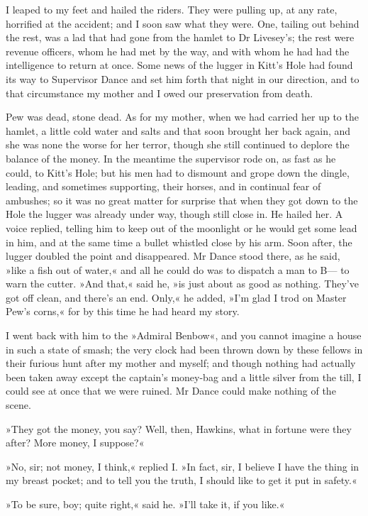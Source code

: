 I leaped to my feet and hailed the riders. They were pulling up, at any rate, horrified at the accident; and I soon saw what they were. One, tailing out behind the rest, was a lad that had gone from the hamlet to Dr Livesey's; the rest were revenue officers, whom he had met by the way, and with whom he had had the intelligence to return at once. Some news of the lugger in Kitt's Hole had found its way to Supervisor Dance and set him forth that night in our direction, and to that circumstance my mother and I owed our preservation from death.

Pew was dead, stone dead. As for my mother, when we had carried her up to the hamlet, a little cold water and salts and that soon brought her back again, and she was none the worse for her terror, though she still continued to deplore the balance of the money. In the meantime the supervisor rode on, as fast as he could, to Kitt's Hole; but his men had to dismount and grope down the dingle, leading, and sometimes supporting, their horses, and in continual fear of ambushes; so it was no great matter for surprise that when they got down to the Hole the lugger was already under way, though still close in. He hailed her. A voice replied, telling him to keep out of the moonlight or he would get some lead in him, and at the same time a bullet whistled close by his arm. Soon after, the lugger doubled the point and disappeared. Mr Dance stood there, as he said, »like a fish out of water,« and all he could do was to dispatch a man to B— to warn the cutter. »And that,« said he, »is just about as good as nothing. They've got off clean, and there's an end. Only,« he added, »I'm glad I trod on Master Pew's corns,« for by this time he had heard my story.

I went back with him to the »Admiral Benbow«, and you cannot imagine a house in such a state of smash; the very clock had been thrown down by these fellows in their furious hunt after my mother and myself; and though nothing had actually been taken away except the captain's money-bag and a little silver from the till, I could see at once that we were ruined. Mr Dance could make nothing of the scene.

»They got the money, you say? Well, then, Hawkins, what in fortune were they after? More money, I suppose?«

»No, sir; not money, I think,« replied I. »In fact, sir, I believe I have the thing in my breast pocket; and to tell you the truth, I should like to get it put in safety.«

»To be sure, boy; quite right,« said he. »I'll take it, if you like.«

